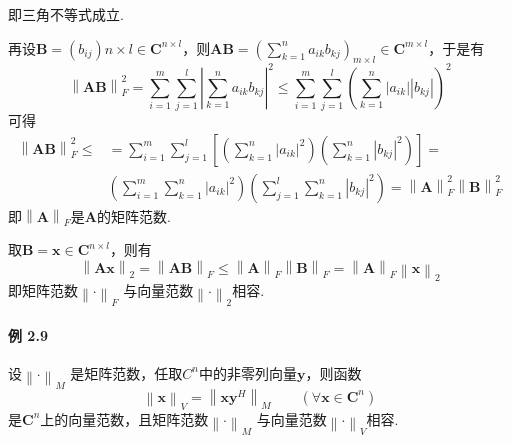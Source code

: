 \documentclass[12pt, a4paper, oneside, fontset=none]{ctexart}
\begin{document}
即三角不等式成立.\par
再设$\bm{B} = (b_{ij}){n\times l} \in \bm{C}^{n\times l}$，则$\bm{AB} = (\sum_{k=1}^na_{ik}b_{kj})_{m\times l} \in \bm{C}^{m \times l}$，于是有
\[
    \left\lVert \bm{AB} \right\rVert ^2_F = \sum_{i=1}^m\sum_{j=1}^l \left\lvert \sum_{k=1}^n a_{ik}b_{kj} \right\rvert ^2 \leqslant \sum_{i=1}^m\sum_{j=1}^l(\sum_{k=1}^n \left\lvert a_{ik} \right\rvert\left\lvert b_{kj} \right\rvert)^2
\]
可得
\begin{align*}
    \left\lVert \bm{AB} \right\rVert ^2_F \leqslant & = \sum_{i=1}^m\sum_{j=1}^l [(\sum_{k=1}^n \left\lvert a_{ik} \right\rvert ^2)(\sum_{k=1}^n \left\lvert b_{kj} \right\rvert ^2)] =                                                                    \\
                                                    & (\sum_{i=1}^m\sum_{k=1}^n\left\lvert a_{ik} \right\rvert ^2)(\sum_{j=1}^l\sum_{k=1}^n \left\lvert b_{kj} \right\rvert ^2) = \left\lVert \bm{A} \right\rVert ^2_F\left\lVert \bm{B} \right\rVert ^2_F
\end{align*}
即$\left\lVert \bm{A} \right\rVert _F$是$\bm{A}$的矩阵范数.\par
取$\bm{B} = \bm{x} \in \bm{C}^{n\times l}$，则有
\[
    \left\lVert \bm{Ax} \right\rVert _2 = \left\lVert \bm{AB} \right\rVert _F \leqslant \left\lVert \bm{A} \right\rVert _F \left\lVert \bm{B} \right\rVert _F =
    \left\lVert \bm{A} \right\rVert _F \left\lVert \bm{x} \right\rVert _2
\]
即矩阵范数$\left\lVert \bm{\cdot} \right\rVert _F$ 与向量范数$\left\lVert \bm{\cdot} \right\rVert _2$相容.

\paragraph*{例 2.9} 设$\left\lVert \bm{\cdot} \right\rVert _M$ 是矩阵范数，任取$C^n$中的非零列向量$\bm{y}$，则函数
\[
    \left\lVert \bm{x} \right\rVert _V = \left\lVert \bm{xy}^H \right\rVert _M \qquad (\forall \bm{x} \in \bm{C}^n)
\]
是$\bm{C}^n$上的向量范数，且矩阵范数$\left\lVert \bm{\cdot} \right\rVert _M$ 与向量范数$\left\lVert \bm{\cdot} \right\rVert _V$相容.
\end{document}
